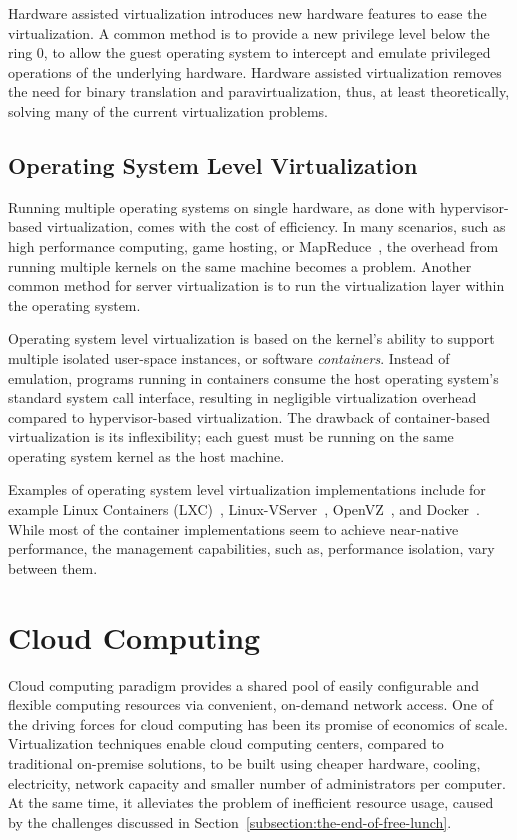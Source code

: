 Hardware assisted virtualization introduces new hardware features to ease the virtualization. A common method is to provide a new privilege level below the ring 0, to allow the guest operating system to intercept and emulate privileged operations of the underlying hardware. Hardware assisted virtualization removes the need for binary translation and paravirtualization, thus, at least theoretically, solving many of the current virtualization problems.~\cite{Horne:2007:Understanding, Pearce:2013:VIS}

\subsection{Operating System Level Virtualization}
Running multiple operating systems on single hardware, as done with hypervisor-based virtualization, comes with the cost of efficiency. In many scenarios, such as high performance computing, game hosting, or MapReduce~\cite{Dean:2008:MR}, the overhead from running multiple kernels on the same machine becomes a problem. Another common method for server virtualization is to run the virtualization layer within the operating system.~\cite{Soltesz:2007:COS, Xavier:2014:Containers}

Operating system level virtualization is based on the kernel's ability to support multiple isolated user-space instances, or software \emph{containers}. Instead of emulation, programs running in containers consume the host operating system's standard system call interface, resulting in negligible virtualization overhead compared to hypervisor-based virtualization. The drawback of container-based virtualization is its inflexibility; each guest must be running on the same operating system kernel as the host machine.~\cite{Soltesz:2007:COS, Xavier:2014:Containers}

Examples of operating system level virtualization implementations include for example Linux Containers (LXC)~\cite{LinuxContainers:2013:LXC}, Linux-VServer~\cite{Des:2005:Virtualization}, OpenVZ~\cite{OpenVZ:2013}, and Docker~\cite{Merkel:2014:Docker}. While most of the container implementations seem to achieve near-native performance, the management capabilities, such as, performance isolation, vary between them.

\section{Cloud Computing}
Cloud computing paradigm provides a shared pool of easily configurable and flexible computing resources via convenient, on-demand network access. One of the driving forces for cloud computing has been its promise of economics of scale. Virtualization techniques enable cloud computing centers, compared to traditional on-premise solutions, to be built using cheaper hardware, cooling, electricity, network capacity and smaller number of administrators per computer. At the same time, it alleviates the problem of inefficient resource usage, caused by the challenges discussed in Section~\ref{subsection:the-end-of-free-lunch}.~\cite{Mell:2011:ccdef}

